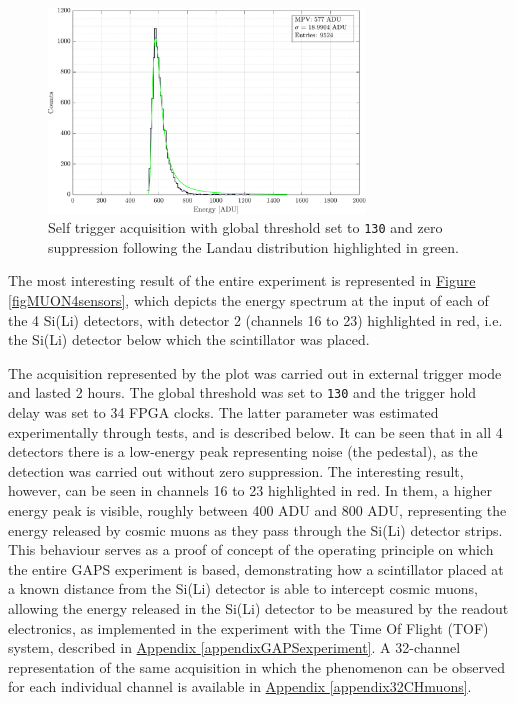 \begin{figure}[h!]
    \centering
    \includegraphics[width=0.75\textwidth]{Images/chap3/results/muons/incoming_energy_thr130_ZS_landau.pdf}
    \caption{Self trigger acquisition with global threshold set to \texttt{130} and zero suppression following the Landau distribution highlighted in green.}
    \label{figMUONlandau}
\end{figure}

\par
The most interesting result of the entire experiment is represented in \hyperref[figMUON4sensors]{Figure \ref{figMUON4sensors}}, which depicts the energy spectrum at the input of each of the 4 Si(Li) detectors, with detector 2 (channels 16 to 23) highlighted in red, i.e. the Si(Li) detector below which the scintillator was placed.

\par
The acquisition represented by the plot was carried out in external trigger mode and lasted 2 hours. The global threshold was set to \texttt{130} and the trigger hold delay was set to 34 FPGA clocks. The latter parameter was estimated experimentally through tests, and is described below. It can be seen that in all 4 detectors there is a low-energy peak representing noise (the pedestal), as the detection was carried out without zero suppression. The interesting result, however, can be seen in channels 16 to 23 highlighted in red. In them, a higher energy peak is visible, roughly between 400 ADU and 800 ADU, representing the energy released by cosmic muons as they pass through the Si(Li) detector strips. This behaviour serves as a proof of concept of the operating principle on which the entire GAPS experiment is based, demonstrating how a scintillator placed at a known distance from the Si(Li) detector is able to intercept cosmic muons, allowing the energy released in the Si(Li) detector to be measured by the readout electronics, as implemented in the experiment with the Time Of Flight (TOF) system, described in \hyperref[appendixGAPSexperiment]{Appendix \ref{appendixGAPSexperiment}}. A 32-channel representation of the same acquisition in which the phenomenon can be observed for each individual channel is available in \hyperref[appendix32CHmuons]{Appendix \ref{appendix32CHmuons}}.

